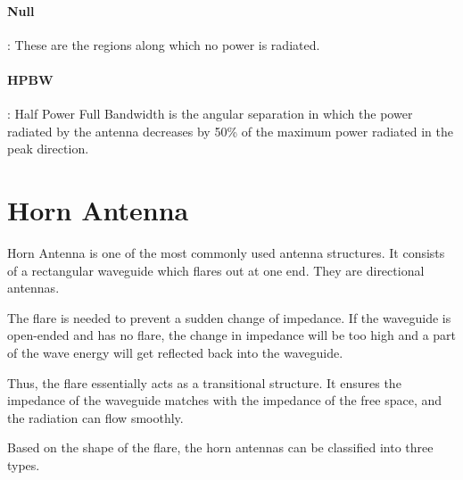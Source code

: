 \documentclass[12pt]{article}
\begin{document}
\paragraph{Null} : These are the regions along which no power is radiated. 
\paragraph{HPBW} : Half Power Full Bandwidth is the angular separation in which the power radiated by the antenna decreases by 50\% of the maximum power radiated in the peak direction.
\section{Horn Antenna}
Horn Antenna is one of the most commonly used antenna structures. It consists of a rectangular waveguide which flares out at one end. They are directional antennas. \linebreak

The flare is needed to prevent a sudden change of impedance. If the waveguide is open-ended and has no flare, the change in impedance will be too high and a part of the wave energy will get reflected back into the waveguide. \linebreak 

Thus, the flare essentially acts as a transitional structure. It ensures the impedance of the waveguide matches with the impedance of the free space, and the radiation can flow smoothly. \linebreak

Based on the shape of the flare, the horn antennas can be classified into three types.
\end{document}
